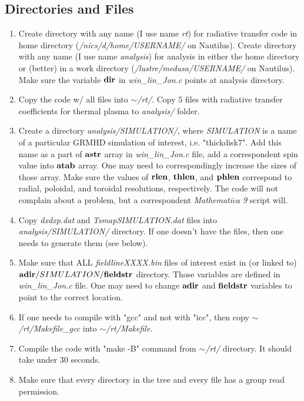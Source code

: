 \documentclass{emulateapj}
\newcommand{\mat}{\textit{Mathematica 9 }}
\begin{document}
\subsection{Directories and Files}
\label{sec:dirs-files}
\begin{enumerate}
\item{Create directory with any name (I use name \textit{rt}) for
  radiative transfer code in home directory
  (\textit{/nics/d/home/USERNAME/} on Nautilus).  Create directory
  with any name (I use name \textit{analysis}) for analysis in either
  the home directory or (better) in a work directory
  (\textit{/lustre/medusa/USERNAME/} on Nautilus).  Make sure the
  variable ${\bf dir}$ in \textit{win\_lin\_Jon.c} points at analysis
  directory.}
\item{Copy the code w/ all files into \textit{$\sim$/rt/}. Copy $5$
  files with radiative transfer coefficients for thermal plasma to
  \textit{analysis/} folder.}
\item{Create a directory \textit{analysis/SIMULATION/}, where
  \textit{SIMULATION} is a name of a particular GRMHD simulation of
  interest, i.e. "thickdisk7".  Add this name as a part of ${\bf
    astr}$ array in \textit{win\_lin\_Jon.c} file, add a correspondent
  spin value into ${\bf atab}$ array.  One may need to correspondingly
  increase the sizes of those array. Make sure the values of ${\bf
    rlen}$, ${\bf thlen}$, and ${\bf phlen}$ correspond to radial,
  poloidal, and toroidal resolutions, respectively. The code will not
  complain about a problem, but a correspondent \mat script will.}
\item{Copy \textit{dxdxp.dat} and \textit{TsmapSIMULATION.dat} files
  into \textit{analysis/SIMULATION/} directory. If one doesn't have
  the files, then one needs to generate them (see below).}
\item{Make sure that ALL \textit{fieldlineXXXX.bin} files of interest
  exist in (or linked to) ${\bf adir}/SIMULATION/{\bf fieldstr}$
  directory.  Those variables are defined in \textit{win\_lin\_Jon.c}
  file. One may need to change ${\bf adir}$ and ${\bf fieldstr}$
  variables to point to the correct location.}
\item{If one needs to compile with "gcc" and not with "icc", then copy
  \textit{$\sim$/rt/Makefile\_gcc} into \textit{$\sim$/rt/Makefile}.}
\item{Compile the code with "make -B" command from \textit{$\sim$/rt/}
  directory. It should take under 30 seconds.}
\item{Make sure that every directory in the tree and every file has a
  group read permission.}
\end{enumerate}
\end{document}
